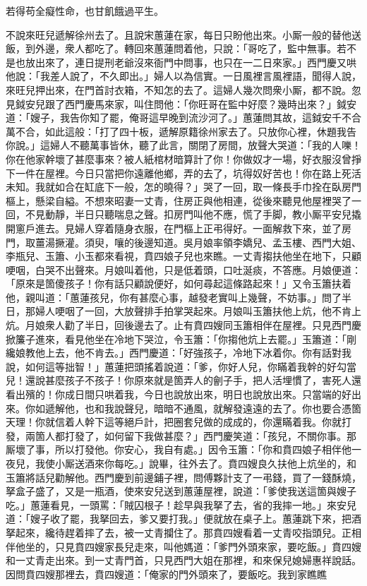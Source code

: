 \begin{myquote}
若得苟全癡性命，也甘飢餓過平生。
\end{myquote}

不說來旺兒遞解徐州去了。且說宋蕙蓮在家，每日只盼他出來。小厮一般的替他送飯，到外邊，衆人都吃了。轉回來蕙蓮問着他，只說：「哥吃了，監中無事。若不是也放出來了，連日提刑老爺沒來衙門中問事，也只在一二日來家。」西門慶又哄他說：「我差人說了，不久即出。」婦人以為信實。一日風裡言風裡語，聞得人說，來旺兒押出來，在門首討衣箱，不知怎的去了。這婦人幾次問衆小厮，都不說。忽見鉞安兒跟了西門慶馬來家，叫住問他：「你旺哥在監中好麼？幾時出來？」鉞安道：「嫂子，我告你知了罷，俺哥這早晚到流沙河了。」蕙蓮問其故，這鉞安千不合萬不合，如此這般：「打了四十板，遞解原籍徐州家去了。只放你心裡，休題我告你說。」這婦人不聽萬事皆休，聽了此言，關閉了房間，放聲大哭道：「我的人嚛！你在他家幹壞了甚麼事來？被人紙棺材暗算計了你！你做奴才一場，好衣服沒曾掙下一件在屋裡。今日只當把你遠離他鄉，弄的去了，坑得奴好苦也！你在路上死活未知。我就如合在缸底下一般，怎的曉得？」{}哭了一回，取一條長手巾拴在臥房門樞上，懸梁自縊。不想來昭妻一丈青，住房正與他相連，從後來聽見他屋裡哭了一回，不見動靜，半日只聽喘息之聲。扣房門叫他不應，慌了手脚，教小厮平安兒撬開窻戶進去。見婦人穿着隨身衣服，在門樞上正弔得好。一面解救下來，並了房門，取薑湯撅灌。須臾，嚷的後邊知道。吳月娘率領李嬌兒、孟玉樓、西門大姐、李瓶兒、玉簫、小玉都來看視，賁四娘子兒也來瞧。一丈青搊扶他坐在地下，只顧哽咽，白哭不出聲來。月娘叫着他，只是低着頭，口吐涎痰，不答應。月娘便道：「原來是箇傻孩子！你有話只顧說便好，如何尋起這條路起來！」又令玉簫扶着他，親叫道：「蕙蓮孩兒，你有甚麼心事，越發老實叫上幾聲，不妨事。」{}問了半日，那婦人哽咽了一回，大放聲排手拍掌哭起來。月娘叫玉簫扶他上炕，他不肯上炕。月娘衆人勸了半日，回後邊去了。止有賁四嫂同玉簫相伴在屋裡。只見西門慶掀簾子進來，看見他坐在冷地下哭泣，令玉簫：「你搊他炕上去罷。」玉簫道：「剛纔娘教他上去，他不肯去。」西門慶道：「好強孩子，冷地下冰着你。你有話對我說，如何這等拙智！」蕙蓮把頭搖着說道：「爹，你好人兒，你瞞着我幹的好勾當兒！還說甚麼孩子不孩子！你原來就是箇弄人的劊子手，把人活埋慣了，害死人還看出殯的！{}你成日間只哄着我，今日也說放出來，明日也說放出來。只當端的好出來。你如遞解他，也和我說聲兒，暗暗不通風，就解發遠遠的去了。你也要合憑箇天理！你就信着人幹下這等絕戶計，把圈套兒做的成成的，你還瞞着我。你就打發，兩箇人都打發了，如何留下我做甚麼？」{}西門慶笑道：「孩兒，不關你事。那厮壞了事，所以打發他。你安心，我自有處。」因令玉簫：「你和賁四娘子相伴他一夜兒，我使小厮送酒來你每吃。」說畢，往外去了。賁四嫂良久扶他上炕坐的，和玉簫將話兒勸解他。西門慶到前邊鋪子裡，問傅夥計支了一弔錢，買了一錢酥燒，拏盒子盛了，又是一瓶酒，使來安兒送到蕙蓮屋裡，說道：「爹使我送這箇與嫂子吃。」蕙蓮看見，一頭罵：「賊囚根子！趁早與我拏了去，省的我摔一地。」{}來安兒道：「嫂子收了罷，我拏回去，爹又要打我。」便就放在桌子上。蕙蓮跳下來，把酒拏起來，纔待趕着摔了去，被一丈青攔住了。那賁四嫂看着一丈青咬指頭兒。正相伴他坐的，只見賁四嫂家長兒走來，叫他媽道：「爹門外頭來家，要吃飯。」賁四嫂和一丈青走出來。到一丈青門首，只見西門大姐在那裡，和來保兒媳婦惠祥說話。因問賁四嫂那裡去，賁四嫂道：「俺家的門外頭來了，要飯吃。我到家瞧瞧